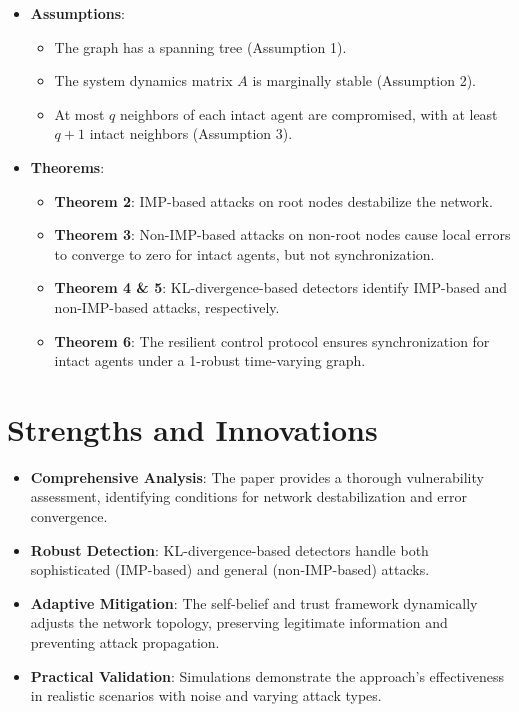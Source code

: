 \documentclass{article}
\begin{document}
\begin{itemize}
    \item \textbf{Assumptions}:
    \begin{itemize}
        \item The graph has a spanning tree (Assumption 1).
        \item The system dynamics matrix $A$ is marginally stable (Assumption 2).
        \item At most $q$ neighbors of each intact agent are compromised, with at least $q+1$ intact neighbors (Assumption 3).
    \end{itemize}

    \item \textbf{Theorems}:
    \begin{itemize}
        \item \textbf{Theorem 2}: IMP-based attacks on root nodes destabilize the network.
        \item \textbf{Theorem 3}: Non-IMP-based attacks on non-root nodes cause local errors to converge to zero for intact agents, but not synchronization.
        \item \textbf{Theorem 4 \& 5}: KL-divergence-based detectors identify IMP-based and non-IMP-based attacks, respectively.
        \item \textbf{Theorem 6}: The resilient control protocol ensures synchronization for intact agents under a 1-robust time-varying graph.
    \end{itemize}
\end{itemize}

\section*{Strengths and Innovations}
\begin{itemize}
    \item \textbf{Comprehensive Analysis}: The paper provides a thorough vulnerability assessment, identifying conditions for network destabilization and error convergence.
    \item \textbf{Robust Detection}: KL-divergence-based detectors handle both sophisticated (IMP-based) and general (non-IMP-based) attacks.
    \item \textbf{Adaptive Mitigation}: The self-belief and trust framework dynamically adjusts the network topology, preserving legitimate information and preventing attack propagation.
    \item \textbf{Practical Validation}: Simulations demonstrate the approach’s effectiveness in realistic scenarios with noise and varying attack types.
\end{itemize}
\end{document}
